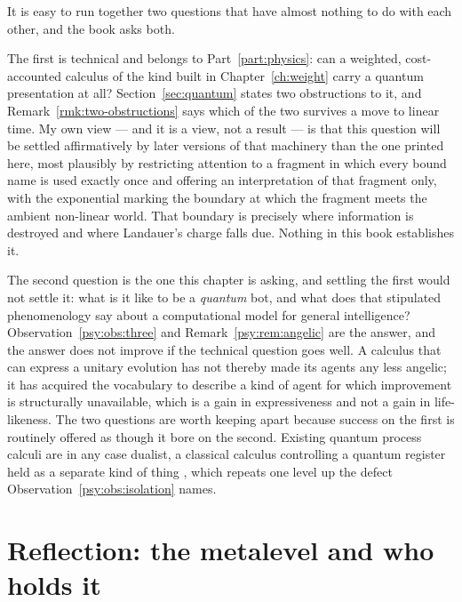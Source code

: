 \begin{remark}
\label{psy:rem:two-quantum}
It is easy to run together two questions that have almost nothing to
do with each other, and the book asks both.

The first is technical and belongs to Part~\ref{part:physics}: can
a weighted, cost-accounted calculus of the kind built in
Chapter~\ref{ch:weight} carry a quantum presentation at all?
Section~\ref{sec:quantum} states two obstructions to it, and
Remark~\ref{rmk:two-obstructions} says which of the two survives a
move to linear time.
My own view --- and it is a view, not a result --- is that this
question will be settled affirmatively by later versions of that
machinery than the one printed here, most plausibly by restricting
attention to a fragment in which every bound name is used exactly
once and offering an interpretation of that fragment only, with the
exponential marking the boundary at which the fragment meets the
ambient non-linear world.
That boundary is precisely where information is destroyed and where
Landauer's charge falls due.
Nothing in this book establishes it.

The second question is the one this chapter is asking, and settling
the first would not settle it: what is it like to be a \emph{quantum}
bot, and what does that stipulated phenomenology say about a
computational model for general intelligence?
Observation~\ref{psy:obs:three} and Remark~\ref{psy:rem:angelic} are
the answer, and the answer does not improve if the technical
question goes well.
A calculus that can express a unitary evolution has not thereby made
its agents any less angelic; it has acquired the vocabulary to
describe a kind of agent for which improvement is structurally
unavailable, which is a gain in expressiveness and not a gain in
life-likeness.
The two questions are worth keeping apart because success on the
first is routinely offered as though it bore on the second.
Existing quantum process calculi are in any case dualist, a
classical calculus controlling a quantum register held as a separate
kind of thing \cite{gay2005,danos2004reversible}, which repeats one level up
the defect Observation~\ref{psy:obs:isolation} names.
\end{remark}

\section{Reflection: the metalevel and who holds it}
\label{psy:sec:reflection}

